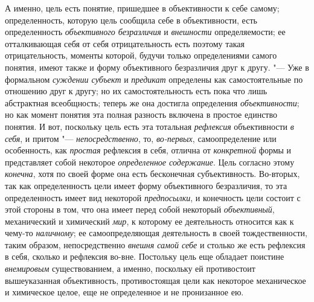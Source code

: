 А именно, цель есть понятие, пришедшее в объективности к себе
самому; определенность, которую цель сообщила себе в объективности, есть
определенность {\em объективного безразличия} и {\em внешности}
определяемости; ее отталкивающая себя от себя отрицательность
есть поэтому такая отрицательность, моменты которой, будучи только
определениями самого понятия, имеют также и форму объективного безразличия
друг к другу. "--- Уже в формальном
{\em суждении субъект} и
{\em предикат} определены
как самостоятельные по отношению друг к другу; но их самостоятельность есть
пока что лишь абстрактная всеобщность; теперь же она достигла определения
{\em объективности}; но
как момент понятия эта полная разность включена в простое единство понятия.
И вот, поскольку цель есть эта тотальная
{\em рефлексия}
объективности {\em в
себя}, и притом
"--- {\em непосредственно},
то, {\em во-первых},
самоопределение или особенность, как
{\em простая} рефлексия в
себя, отлична от {\em конкретной}
формы и представляет собой некоторое
{\em определенное содержание}.
Цель согласно этому
{\em конечна}, хотя по
своей форме она есть бесконечная субъективность. Во-вторых, так как
определенность цели имеет форму объективного безразличия, то эта
определенность имеет вид некоторой
{\em предпосылки}, и
конечность цели состоит с этой стороны в том, что она имеет перед собой
некоторый {\em объективный},
механический и химический
{\em мир}, к которому ее
деятельность относится как к чему-то
{\em наличному}; ее
самоопределяющая деятельность в своей тождественности, таким образом,
непосредственно {\em внешня самой себе}
и столько же есть рефлексия в себя, сколько и рефлексия
во-вне. Постольку цель еще обладает поистине
{\em внемировым}
существованием, а именно, поскольку ей противостоит
вышеуказанная объективность, противостоящая цели как
некоторое механическое и химическое целое, еще не определенное и не
пронизанное ею.

